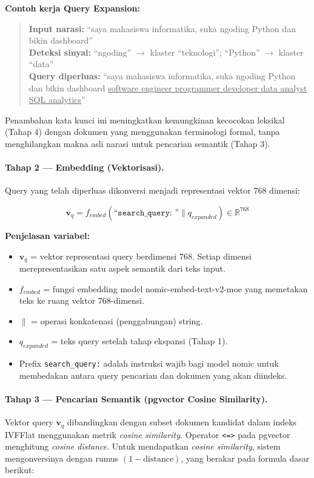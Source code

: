 \textbf{Contoh kerja Query Expansion:}
\begin{quote}
\small
\textbf{Input narasi:} ``saya mahasiswa informatika, suka ngoding Python dan bikin dashboard''\\
\textbf{Deteksi sinyal:} ``ngoding'' $\to$ klaster ``teknologi''; ``Python'' $\to$ klaster ``data''\\
\textbf{Query diperluas:} ``saya mahasiswa informatika, suka ngoding Python dan bikin dashboard
  \underline{software engineer programmer developer data analyst SQL analytics}''
\end{quote}

Penambahan kata kunci ini meningkatkan kemungkinan kecocokan leksikal (Tahap 4)
dengan dokumen yang menggunakan terminologi formal, tanpa menghilangkan makna
asli narasi untuk pencarian semantik (Tahap 3).

\paragraph{Tahap 2 --- Embedding (Vektorisasi).}
Query yang telah diperluas dikonversi menjadi representasi vektor 768 dimensi:

\begin{equation}
  \mathbf{v}_q = f_{embed}(\texttt{``search\_query: ''} \| q_{expanded}) \in \mathbb{R}^{768}
  \label{eq:embedding}
\end{equation}

\noindent \textbf{Penjelasan variabel:}
\begin{itemize}[noitemsep]
  \item $\mathbf{v}_q$ = vektor representasi query berdimensi 768. Setiap dimensi
    merepresentasikan satu aspek semantik dari teks input.
  \item $f_{embed}$ = fungsi embedding model nomic-embed-text-v2-moe yang memetakan
    teks ke ruang vektor 768-dimensi.
  \item $\|$ = operasi konkatenasi (penggabungan) string.
  \item $q_{expanded}$ = teks query setelah tahap ekspansi (Tahap 1).
  \item Prefix \texttt{search\_query:} adalah instruksi wajib bagi model nomic untuk
    membedakan antara query pencarian dan dokumen yang akan diindeks.
\end{itemize}

\paragraph{Tahap 3 --- Pencarian Semantik (pgvector Cosine Similarity).}
Vektor query $\mathbf{v}_q$ dibandingkan dengan subset dokumen kandidat dalam indeks IVFFlat
menggunakan metrik \textit{cosine similarity}. Operator \texttt{<=>} pada pgvector 
menghitung \textit{cosine distance}. Untuk mendapatkan \textit{cosine similarity}, sistem 
mengonversinya dengan rumus $(1 - \text{distance})$, yang berakar pada formula dasar berikut:

